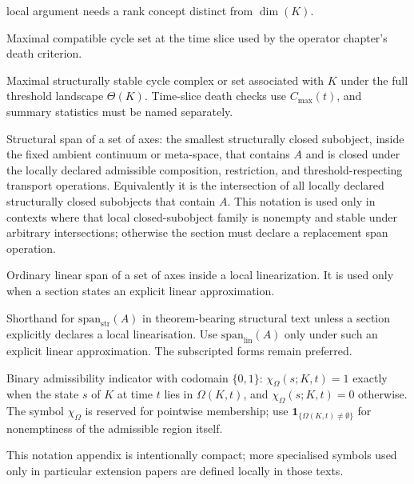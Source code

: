 \begin{description}
        local argument needs a rank concept distinct from \(\dim(K)\).
  \item[\(C_{\max}(t)\)] Maximal compatible cycle set at the time slice used by
        the operator chapter's death criterion.
  \item[\(C_{\max}(K)\)] Maximal structurally stable cycle complex or set
        associated with \(K\) under the full threshold landscape
        \(\Theta(K)\). Time-slice death checks use \(C_{\max}(t)\), and
        summary statistics must be named separately.
  \item[\(\mathrm{span}_{\mathrm{str}}(A)\)] Structural span of a set of
        axes: the smallest structurally closed subobject, inside the fixed
        ambient continuum or meta-space, that contains \(A\) and is closed
        under the locally declared admissible composition, restriction, and
        threshold-respecting transport operations. Equivalently it is the
        intersection of all locally declared structurally closed subobjects
        that contain \(A\). This notation is used only in contexts where that
        local closed-subobject family is nonempty and stable under arbitrary
        intersections; otherwise the section must declare a replacement span
        operation.
  \item[\(\mathrm{span}_{\mathrm{lin}}(A)\)] Ordinary linear span of a set of
        axes inside a local linearization. It is used only when a section
        states an explicit linear approximation.
  \item[\(\mathrm{span}(A)\)] Shorthand for
        \(\mathrm{span}_{\mathrm{str}}(A)\) in theorem-bearing structural
        text unless a section explicitly declares a local linearisation. Use
        \(\mathrm{span}_{\mathrm{lin}}(A)\) only under such an explicit linear
        approximation. The subscripted forms remain preferred.
  \item[\(\chi_{\Omega}(s;K,t)\)] Binary admissibility indicator with codomain
        \(\{0,1\}\): \(\chi_{\Omega}(s;K,t)=1\) exactly when the state \(s\)
        of \(K\) at time \(t\) lies in \(\Omega(K,t)\), and
        \(\chi_{\Omega}(s;K,t)=0\) otherwise. The symbol
        \(\chi_{\Omega}\) is reserved for pointwise membership; use
        \(\mathbf{1}_{\{\Omega(K,t)\neq\emptyset\}}\) for nonemptiness of the
        admissible region itself.
\end{description}

This notation appendix is intentionally compact; more specialised symbols used
only in particular extension papers are defined locally in those texts.

